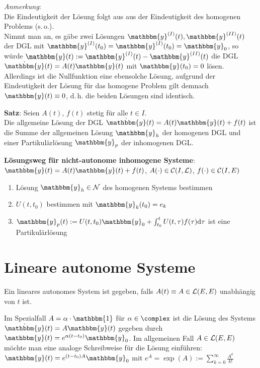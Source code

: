 \emph{Anmerkung}: \\
Die Eindeutigkeit der Lösung folgt aus aus der Eindeutigkeit des homogenen
Problems (s.\,o.). \\
Nimmt man an, es gäbe zwei Lösungen
$\mathbbm{y}^{(I)}(t), \mathbbm{y}^{(II)}(t)$ der DGL mit
$\mathbbm{y}^{(I)}(t_0) = \mathbbm{y}^{(I)}(t_0) = \mathbbm{y}_0$,
so würde $\mathbbm{y}(t) := \mathbbm{y}^{(I)}(t) - \mathbbm{y}^{(II)}(t)$
die DGL $\dot{\mathbbm{y}}(t) = A(t) \mathbbm{y}(t)$ mit
$\mathbbm{y}(t_0) = 0$ lösen.
Allerdings ist die Nullfunktion eine ebensolche Lösung, aufgrund der
Eindeutigkeit der Lösung für das homogene Problem
gilt demnach $\mathbbm{y}(t) \equiv 0$, d.\,h.
die beiden Lösungen sind identisch.

\textbf{Satz}:
Seien $A(t)$, $f(t)$ stetig für alle $t \in I$. \\
Die allgemeine Lösung der DGL
$\dot{\mathbbm{y}}(t) = A(t) \mathbbm{y}(t) + f(t)$ ist die Summe
der allgemeinen Lösung $\mathbbm{y}_h$ der homogenen DGL
und einer Partikulärlösung $\mathbbm{y}_p$ der inhomogenen DGL.

\linie

\textbf{Lösungsweg für nicht-autonome inhomogene Systeme}: \\
$\dot{\mathbbm{y}}(t) = A(t) \mathbbm{y}(t) + f(t)$,
$A(\cdot) \in \mathcal{C}(I, \mathcal{L})$, $f(\cdot) \in \mathcal{C}(I, E)$
\begin{enumerate}
    \item
    Lösung $\mathbbm{y}_h \in \mathcal{N}$ des homogenen Systems bestimmen

    \item
    $U(t, t_0)$ bestimmen mit $\mathbbm{y}_k(t_0) = e_k$

    \item
    $\mathbbm{y}_p(t) := U(t, t_0) \mathbbm{y}_0 +
    \int_{t_0}^t U(t, \tau) f(\tau) \d\tau$
    ist eine Partikulärlösung
\end{enumerate}

\section{%
    Lineare autonome Systeme%
}

Ein lineares autonomes System ist gegeben, falls $A(t) \equiv A \in \mathcal{L}(E, E)$
unabhängig von $t$ ist.

Im Spezialfall $A = \alpha \cdot \mathbbm{1}$ für $\alpha \in \complex$ ist
die Lösung des Systems $\dot{\mathbbm{y}}(t) = A \mathbbm{y}(t)$ gegeben durch
$\mathbbm{y}(t) = e^{\alpha (t - t_0)} \mathbbm{y}_0$.
Im allgemeinen Fall $A \in \mathcal{L}(E, E)$ möchte man eine analoge Schreibweise
für die Lösung einführen:
$\mathbbm{y}(t) = e^{(t - t_0) A} \mathbbm{y}_0$ mit
$e^A = \exp(A) := \sum_{k=0}^\infty \frac{A^k}{k!}$

